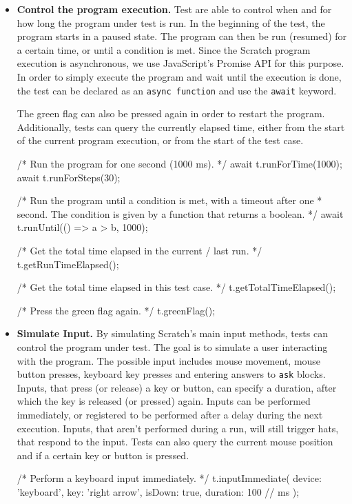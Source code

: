 \begin{itemize}
    \item \textbf{Control the program execution.}
        Test are able to control when and for how long the program under test is run.
        In the beginning of the test, the program starts in a paused state.
        The program can then be run (resumed) for a certain time, or until a condition is met.
        Since the Scratch program execution is asynchronous, we use JavaScript's Promise API for this purpose.
        In order to simply execute the program and wait until the execution is done, the test can be declared as an \texttt{async function} and use the \texttt{await} keyword.

        The green flag can also be pressed again in order to restart the program.
        Additionally, tests can query the currently elapsed time,
        either from the start of the current program execution,
        or from the start of the test case.
        \begin{javascriptcode}
            /* Run the program for one second (1000 ms). */
            await t.runForTime(1000);
            await t.runForSteps(30);

            /* Run the program until a condition is met, with a timeout after one
             * second. The condition is given by a function that returns a boolean. */
            await t.runUntil(() => a > b, 1000);

            /* Get the total time elapsed in the current / last run. */
            t.getRunTimeElapsed();

            /* Get the total time elapsed in this test case. */
            t.getTotalTimeElapsed();

            /* Press the green flag again. */
            t.greenFlag();
        \end{javascriptcode}
    \item \textbf{Simulate Input.}
        By simulating Scratch's main input methods, tests can control the program under test.
        The goal is to simulate a user interacting with the program.
        The possible input includes mouse movement, mouse button presses, keyboard key presses and entering answers to \texttt{ask} blocks.
        Inputs, that press (or release) a key or button, can specify a duration, after which the key is released (or pressed) again.
        Inputs can be performed immediately, or registered to be performed after a delay during the next execution.
        Inputs, that aren't performed during a run, will still trigger hats, that respond to the input.
        Tests can also query the current mouse position and if a certain key or button is pressed.
        \begin{javascriptcode}
            /* Perform a keyboard input immediately. */
            t.inputImmediate({
                device: 'keyboard',
                key: 'right arrow',
                isDown: true,
                duration: 100 // ms
            });


\end{javascriptcode}
\end{itemize}
